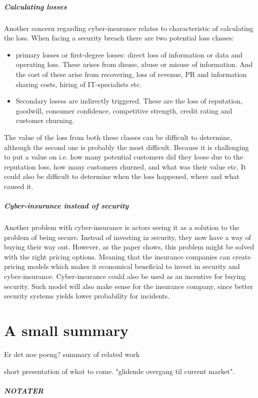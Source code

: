 \subparagraph{Calculating losses} Another concern regarding cyber-insurance relates to characteristic of calculating the loss. When facing a security breach there are two potential loss classes:\cite{bandyopadhyay2009managers,mehr1980principles} 
\begin{itemize}
\item primary losses or first-degree losses: direct loss of information or data and operating loss. 
These arises from disuse, abuse or misuse of information.
 And the cost of these arise from recovering, loss of revenue, 
 PR and information sharing costs, hiring of IT-specialists etc.
 \item Secondary losess are indirectly triggered. These are the loss of reputation, goodwill, 
consumer confidence, competitive strength, credit rating and customer churning. 
\end{itemize}
The value of the loss from both these classes can be difficult to determine, although the second one is probably the most difficult. Because it is challenging to put a value on i.e. how many potential customers did they loose due to the reputation loss, how many customers churned, and what was their value etc.
It could also be difficult to determine when the loss happened, where and what caused it.


\subparagraph{Cyber-insurance instead of security}
Another problem with cyber-insurance is actors seeing it as a solution to the problem of being secure. Instead of investing in security, they now have a way of buying their way out. 
However, as the paper \cite{bolot2008cyber} shows, this problem might be solved with the right pricing options. Meaning that the insurance companies can create pricing models which makes it economical beneficial to invest in security and cyber-insurance. Cyber-insurance could also be used as an incentive for buying security. Such model will also make sense for the insurance company, since better security systems yields lower probability for incidents.


\section{A small summary}
Er det noe poeng?
summary of related work  

short presentation of what to come. "glidende overgang til current market".

\subparagraph{NOTATER}
